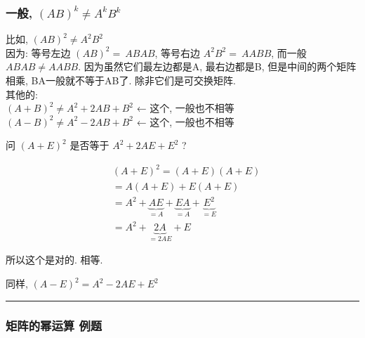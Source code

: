 \documentclass[UTF8]{ctexart}
\begin{document}
\subsubsection{一般, $\left( AB \right) ^k\ne A^k B^k$ }

比如,  $\left( AB \right) ^2\ne A^2 B^2$ \\
因为: 等号左边 $\left( AB \right) ^2=\ ABAB$, 等号右边 $A^2B^2=\ AABB$, 而一般 $ABAB \ne AABB$. 因为虽然它们最左边都是A, 最右边都是B, 但是中间的两个矩阵相乘, BA一般就不等于AB了. 除非它们是可交换矩阵. \\

其他的: \\
$\left( A+B \right) ^2\ne A^2+2AB+B^2$  ← 这个, 一般也不相等 \\
$\left( A-B \right) ^2\ne A^2-2AB+B^2$  ← 这个, 一般也不相等 \\

\begin{myEnvSample}
问 $\left( A+E \right) ^2$ 是否等于 $A^2+2AE+E^2$ ?

\begin{align*}
		& \left( A+E \right) ^2=\left( A+E \right) \left( A+E \right)\\
	& =A\left( A+E \right) +E\left( A+E \right)\\
	& =A^2+\underset{=A}{\underbrace{AE}}+\underset{=A}{\underbrace{EA}}+\underset{=E}{\underbrace{E^2}}\\
	& =A^2+\underset{=2AE}{\underbrace{2A}}+E
\end{align*}

所以这个是对的. 相等. 
\end{myEnvSample}

同样, $\left( A-E \right) ^2 = A^2-2AE+E^2$ \\

\hrule

\subsubsection{矩阵的幂运算 例题}
\end{document}
